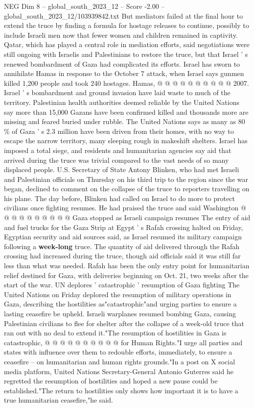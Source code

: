 \begin{textsample}{NEG Dim 8 – global\_south\_2023\_12 – Score -2.00 – global\_south\_2023\_12/103939842.txt}
But mediators failed at the final hour to extend the truce by finding a formula for hostage releases to continue, possibly to include Israeli men now that fewer women and children remained in captivity.
Qatar, which has played a central role in mediation efforts, said negotiations were still ongoing with Israelis and Palestinians to restore the truce, but that Israel ' s renewed bombardment of Gaza had complicated its efforts.
Israel has sworn to annihilate Hamas in response to the October 7 attack, when Israel says gunmen killed 1,200 people and took 240 hostages.
Hamas, @ @ @ @ @ @ @ @ @ @ 2007.
Israel ' s bombardment and ground invasion have laid waste to much of the territory.
Palestinian health authorities deemed reliable by the United Nations say more than 15,000 Gazans have been confirmed killed and thousands more are missing and feared buried under rubble.
The United Nations says as many as 80 \% of Gaza ' s 2.3 million have been driven from their homes, with no way to escape the narrow territory, many sleeping rough in makeshift shelters.
Israel has imposed a total siege, and residents and humanitarian agencies say aid that arrived during the truce was trivial compared to the vast needs of so many displaced people.
U.S.
Secretary of State Antony Blinken, who had met Israeli and Palestinian officials on Thursday on his third trip to the region since the war began, declined to comment on the collapse of the truce to reporters travelling on his plane.
The day before, Blinken had called on Israel to do more to protect civilians once fighting resumes.
He had praised the truce and said Washington @ @ @ @ @ @ @ @ @ @ Gaza stopped as Israeli campaign resumes The entry of aid and fuel trucks for the Gaza Strip at Egypt ' s Rafah crossing halted on Friday, Egyptian security and aid sources said, as Israel resumed its military campaign following a \textbf{week-long} truce.
The quantity of aid delivered through the Rafah crossing had increased during the truce, though aid officials said it was still far less than what was needed.
Rafah has been the only entry point for humanitarian relief destined for Gaza, with deliveries beginning on Oct. 21, two weeks after the start of the war.
UN deplores ' catastrophic ' resumption of Gaza fighting The United Nations on Friday deplored the resumption of military operations in Gaza, describing the hostilities as"catastrophic"and urging parties to ensure a lasting ceasefire be upheld.
Israeli warplanes resumed bombing Gaza, causing Palestinian civilians to flee for shelter after the collapse of a week-old truce that ran out with no deal to extend it."The resumption of hostilities in Gaza is catastrophic, @ @ @ @ @ @ @ @ @ @ for Human Rights."I urge all parties and states with influence over them to redouble efforts, immediately, to ensure a ceasefire -- on humanitarian and human rights grounds."In a post on X social media platform, United Nations Secretary-General Antonio Guterres said he regretted the resumption of hostilities and hoped a new pause could be established."The return to hostilities only shows how important it is to have a true humanitarian ceasefire,"he said.

\end{textsample}
